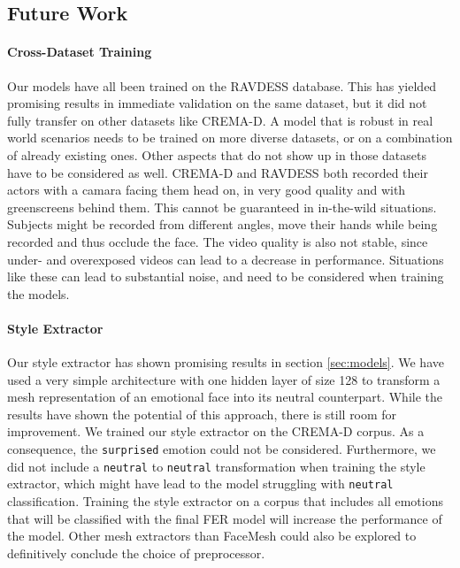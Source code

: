 \subsection{Future Work}

\paragraph{Cross-Dataset Training}
Our models have all been trained on the RAVDESS database. This has yielded promising results in immediate validation on the same dataset, but it did not fully transfer on other datasets like CREMA-D. A model that is robust in real world scenarios needs to be trained on more diverse datasets, or on a combination of already existing ones. Other aspects that do not show up in those datasets have to be considered as well. CREMA-D and RAVDESS both recorded their actors with a camara facing them head on, in very good quality and with greenscreens behind them. This cannot be guaranteed in in-the-wild situations. Subjects might be recorded from different angles, move their hands while being recorded and thus occlude the face. The video quality is also not stable, since under- and overexposed videos can lead to a decrease in performance. Situations like these can lead to substantial noise, and need to be considered when training the models.

\paragraph{Style Extractor}
Our style extractor has shown promising results in section \ref{sec:models}. We have used a very simple architecture with one hidden layer of size 128 to transform a mesh representation of an emotional face into its neutral counterpart. While the results have shown the potential of this approach, there is still room for improvement. We trained our style extractor on the CREMA-D corpus. As a consequence, the \texttt{surprised} emotion could not be considered. Furthermore, we did not include a \texttt{neutral} to \texttt{neutral} transformation when training the style extractor, which might have lead to the model struggling with \texttt{neutral} classification. Training the style extractor on a corpus that includes all emotions that will be classified with the final FER model will increase the performance of the model. Other mesh extractors than FaceMesh could also be explored to definitively conclude the choice of preprocessor. 

